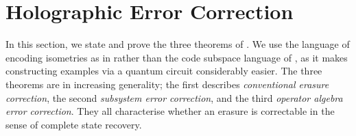 \documentclass[12pt,a4paper]{report}
\numberwithin{equation}{section}
\theoremstyle{definition}
\theoremstyle{theorem}
\theoremstyle{theorem}
\theoremstyle{example}
\theoremstyle{definition}
\begin{document}

\chapter{Holographic Error Correction}

In this section, we state and prove the three theorems of \cite{Harlow}. We use the language of encoding isometries as in \cite{Pollack} rather than the code subspace language of \cite{Harlow}, as it makes constructing examples via a quantum circuit considerably easier. The three theorems are in increasing generality; the first describes \textit{conventional erasure correction}, the second \textit{subsystem error correction}, and the third \textit{operator algebra error correction}. They all characterise whether an erasure is correctable in the sense of complete state recovery.
\end{document}
